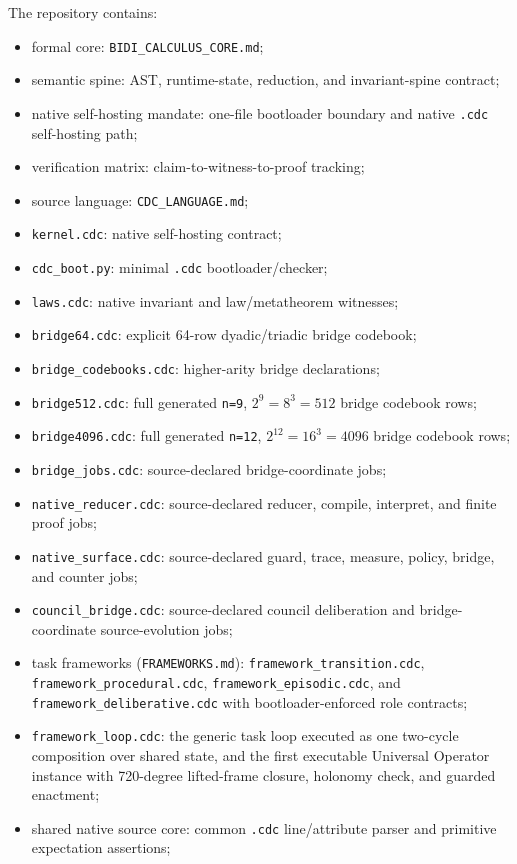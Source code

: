 \documentclass[11pt]{article}
\begin{document}
The repository contains:
\begin{itemize}
\item formal core: \nolinkurl{BIDI_CALCULUS_CORE.md};
\item semantic spine: AST, runtime-state, reduction, and invariant-spine contract;
\item native self-hosting mandate: one-file bootloader boundary and native
\texttt{.cdc} self-hosting path;
\item verification matrix: claim-to-witness-to-proof tracking;
\item source language: \nolinkurl{CDC_LANGUAGE.md};
\item \texttt{kernel.cdc}: native self-hosting contract;
\item \texttt{cdc\_boot.py}: minimal \texttt{.cdc} bootloader/checker;
\item \texttt{laws.cdc}: native invariant and law/metatheorem witnesses;
\item \texttt{bridge64.cdc}: explicit 64-row dyadic/triadic bridge codebook;
\item \texttt{bridge\_codebooks.cdc}: higher-arity bridge declarations;
\item \texttt{bridge512.cdc}: full generated \texttt{n=9}, $2^9=8^3=512$ bridge codebook rows;
\item \texttt{bridge4096.cdc}: full generated \texttt{n=12}, $2^{12}=16^3=4096$ bridge codebook rows;
\item \texttt{bridge\_jobs.cdc}: source-declared bridge-coordinate jobs;
\item \texttt{native\_reducer.cdc}: source-declared reducer, compile, interpret, and finite proof jobs;
\item \texttt{native\_surface.cdc}: source-declared guard, trace, measure, policy, bridge, and counter jobs;
\item \texttt{council\_bridge.cdc}: source-declared council deliberation and bridge-coordinate source-evolution jobs;
\item task frameworks (\nolinkurl{FRAMEWORKS.md}): \texttt{framework\_transition.cdc}, \texttt{framework\_procedural.cdc}, \texttt{framework\_episodic.cdc}, and \texttt{framework\_deliberative.cdc} with bootloader-enforced role contracts;
\item \texttt{framework\_loop.cdc}: the generic task loop executed as one two-cycle composition over shared state, and the first executable Universal Operator instance with 720-degree lifted-frame closure, holonomy check, and guarded enactment;
\item shared native source core: common \texttt{.cdc} line/attribute parser and primitive expectation assertions;

\end{itemize}
\end{document}
